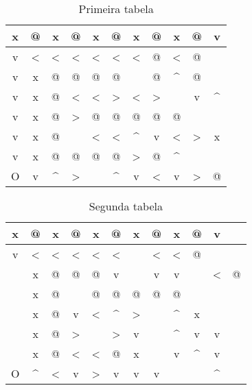 \documentclass{article}
\begin{document}
\begin{table}[h]
	\centering
	\begin{tabular}{|c|c|c|c|c|c|c|c|c|c|c|}
		\hline
		x & @ & x & @      & x      & @ & x      & @ & x      & @      & v \\ \hline
		v & < & < & <      & <      & < & <      & @ & <      & @      &   \\ \hline
		v & x & @ & @      & @      & @ & \hat{} & @ & ^      & @      &   \\ \hline
		v & x & @ & <      & <      & > & <      & > & \hat{} & v      & ^ \\ \hline
		v & x & @ & >      & @      & @ & @      & @ & @      & \hat{} &   \\ \hline
		v & x & @ & \hat{} & <      & < & ^      & v & <      & >      & x \\ \hline
		v & x & @ & @      & @      & @ & >      & @ & ^      & \hat{} &   \\ \hline
		O & v & ^ & >      & \hat{} & ^ & v      & < & v      & >      & @ \\ \hline
	\end{tabular}
	\caption{Primeira tabela}
\end{table}

\begin{table}[h]
	\centering
	\begin{tabular}{|c|c|c|c|c|c|c|c|c|c|c|}
		\hline
		x      & @ & x & @      & x      & @ & x      & @      & x      & @      & v     \\ \hline
		v      & < & < & <      & <      & < & \hat{} & <      & <      & @      &       \\ \hline
		\hat{} & x & @ & @      & @      & v & \hat{} & v      & v      & \hat{} & < & @ \\ \hline
		\hat{} & x & @ & \hat{} & @      & @ & @      & @      & @      & \hat{} &       \\ \hline
		\hat{} & x & @ & v      & <      & ^ & >      & \hat{} & ^      & x      &       \\ \hline
		\hat{} & x & @ & >      & \hat{} & > & v      & \hat{} & ^      & v      & v     \\ \hline
		\hat{} & x & @ & <      & <      & @ & x      & \hat{} & v      & ^      & v     \\ \hline
		O      & ^ & < & v      & >      & v & v      & v      & \hat{} & \hat{} & ^     \\ \hline
	\end{tabular}
	\caption{Segunda tabela}
\end{table}
\end{document}
